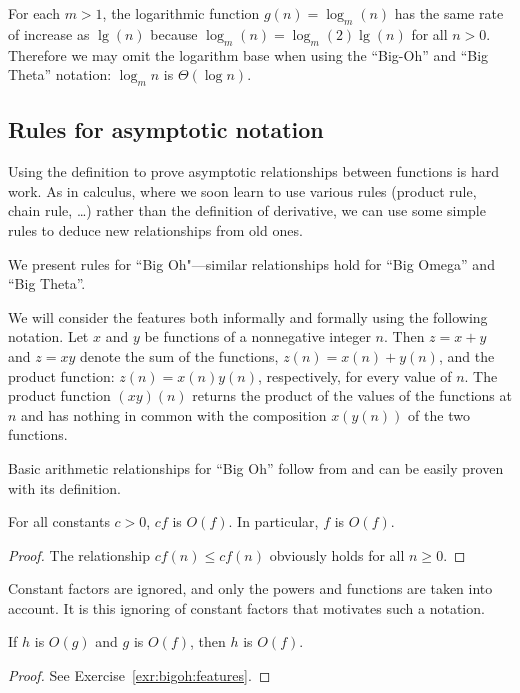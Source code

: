 \begin{Example} 
\label{ex:logs}
For each $m>1$, the logarithmic function $g(n) = \log_{m}(n)$ has the same rate of 
increase as $\lg(n)$ because 
\(\log_{m}(n) = \log_{m}(2)  \lg(n)\) for  all \(n > 0\).
Therefore we may omit the logarithm base when using 
the ``Big-Oh'' and ``Big Theta'' notation: \(\log_{m}n\) is \(\Theta(\log n)\).
\end{Example}


\subsection{Rules for asymptotic notation}
\label{o-features}
 
Using the definition to prove asymptotic relationships between functions is hard
work. As in calculus, where we soon learn to use various rules (product rule, 
chain rule, \dots) rather than the definition of derivative, we can use some 
simple rules to deduce new relationships from old ones.

We present rules for ``Big Oh"---similar relationships hold for ``Big Omega'' 
and ``Big Theta''.

We will consider the features both informally and formally using the
following notation. Let $x$ and $y$ be functions of a nonnegative
integer $n$. Then $z=x+y$ and $z=xy$ denote the sum of the functions,
$z(n) = x(n)+y(n)$, and the product function: $z(n) = x(n)y(n)$,
respectively, for every value of $n$. The product function $(xy)(n)$
returns the product of the values of the functions at $n$ and has
nothing in common with the composition $x(y(n))$ of the two functions.

Basic arithmetic relationships for ``Big Oh''
follow from and can be easily proven with its definition. 

\begin{Lemma}[Scaling] \label{l:bigoh:1}
For all constants $c > 0$, $c  f$ is $O(f)$. In particular, $f$ is $O(f)$. 
\end{Lemma}

\begin{proof}
The relationship \(cf(n) \leq c f(n)\) obviously holds for all \(n\geq 0\).
\end{proof}

Constant factors are ignored, and only the powers and functions are
taken into account. It is this ignoring of constant factors that
motivates such a notation.

\begin{Lemma}[Transitivity] \label{l:bigoh:2}
If $h$ is $O(g)$ and $g$ is $O(f)$, then $h$ is $O(f)$.
\end{Lemma}
\begin{proof}
See Exercise~\ref{exr:bigoh:features}.
\end{proof}


